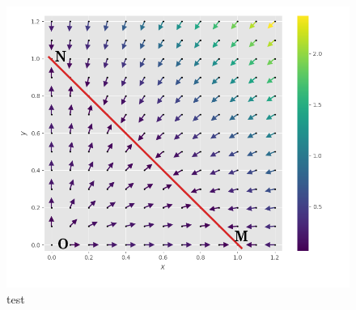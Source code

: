 \documentclass{wsdcr}
\begin{document}
\begin{figure}[t!]
    \centering
    \includegraphics[width=\linewidth]{fig/lv2_vf.png}
    \caption{test}
    \label{fig:vf2}
\end{figure}
\end{document}
